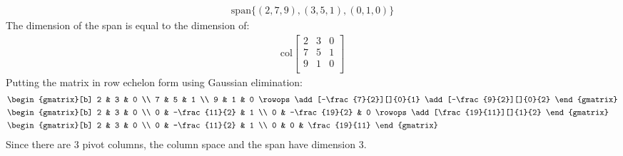 \documentclass{article}
\begin{document}
\begin{align*}
    \mathrm{span}\{(2, 7, 9), (3, 5, 1), (0, 1, 0)\}
\end{align*}
The dimension of the span is equal to the dimension of:
\begin{align*}
    \mathrm{col} \begin{bmatrix}
        2 & 3 & 0 \\
        7 & 5 & 1 \\
        9 & 1 & 0 \\
    \end{bmatrix}
\end{align*}
Putting the matrix in row echelon form using Gaussian elimination:
\begin{align*}
    & \begin{gmatrix}[b]
        2 & 3 & 0 \\
        7 & 5 & 1 \\
        9 & 1 & 0
    \rowops
    \add[-\frac{7}{2}][]{0}{1}
    \add[-\frac{9}{2}][]{0}{2}
    \end{gmatrix}  \\
    & \begin{gmatrix}[b]
        2 & 3 & 0 \\
        0 & -\frac{11}{2} & 1 \\
        0 & -\frac{19}{2} & 0
    \rowops
    \add[\frac{19}{11}][]{1}{2}
    \end{gmatrix}   \\
    & \begin{gmatrix}[b]
        2 & 3 & 0 \\
        0 & -\frac{11}{2} & 1 \\
        0 & 0 & \frac{19}{11}
    \end{gmatrix} 
\end{align*}
Since there are $3$ pivot columns, the column space and the span have dimension $3$.
\end{document}

